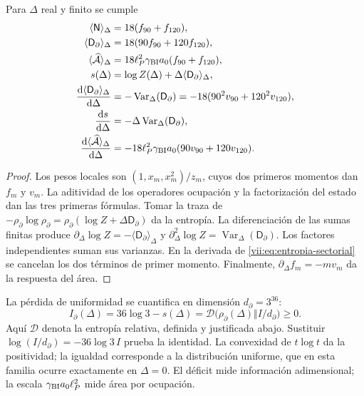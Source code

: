 \begin{proposition}
\label{vii:prop:respuesta-sectorial}
Para \(\Delta\) real y finito se cumple
\begin{align}
 \langle\mathsf N\rangle_\Delta&=18(f_{90}+f_{120}),\\
 \langle\mathsf D_\partial\rangle_\Delta&=18(90f_{90}+120f_{120}),\\
 \langle\widehat{\mathcal A}\rangle_\Delta
 &=18\ell_P^2\gamma_{\rm BI}a_0(f_{90}+f_{120}),\\
 s(\Delta)&=\log Z(\Delta)+\Delta\langle\mathsf D_\partial\rangle_\Delta,
 \label{vii:eq:entropia-sectorial}\\
 \frac{\mathrm d\langle\mathsf D_\partial\rangle_\Delta}{\mathrm d\Delta}
 &=-\operatorname{Var}_\Delta(\mathsf D_\partial)
  =-18(90^2v_{90}+120^2v_{120}),\\
 \frac{\mathrm ds}{\mathrm d\Delta}
 &=-\Delta\operatorname{Var}_\Delta(\mathsf D_\partial),\\
 \frac{\mathrm d\langle\widehat{\mathcal A}\rangle_\Delta}{\mathrm d\Delta}
 &=-18\ell_P^2\gamma_{\rm BI}a_0(90v_{90}+120v_{120}).
 \label{vii:eq:respuestas-area-entropia}
\end{align}
\end{proposition}
\begin{proof}
Los pesos locales son \((1,x_m,x_m^2)/z_m\), cuyos dos primeros
momentos dan \(f_m\) y \(v_m\). La aditividad de los operadores
ocupación y la factorización del estado dan las tres primeras fórmulas.
Tomar la traza de
\(-\rho_\partial\log\rho_\partial
=\rho_\partial(\log Z+\Delta\mathsf D_\partial)\)
da la entropía. La diferenciación de las sumas finitas produce
\(\partial_\Delta\log Z=-\langle\mathsf D_\partial\rangle_\Delta\)
y \(\partial_\Delta^2\log Z
=\operatorname{Var}_\Delta(\mathsf D_\partial)\).
Los factores independientes suman sus varianzas. En la derivada de
\eqref{vii:eq:entropia-sectorial} se cancelan los dos términos de
primer momento. Finalmente, \(\partial_\Delta f_m=-mv_m\)
da la respuesta del área.
\end{proof}

La pérdida de uniformidad se cuantifica en dimensión \(d_\partial=3^{36}\):
\begin{equation}
 I_\partial(\Delta)
 =36\log3-s(\Delta)
 =\mathcal D\bigl(\rho_\partial(\Delta)\Vert I/d_\partial\bigr)\ge0.
 \label{vii:eq:deficit-informacional}
\end{equation}
Aquí \(\mathcal D\) denota la entropía relativa, definida y justificada
abajo. Sustituir \(\log(I/d_\partial)=-36\log3\,I\) prueba la
identidad. La convexidad de \(t\log t\) da la positividad; la igualdad
corresponde a la distribución uniforme, que en esta familia ocurre
exactamente en \(\Delta=0\). El déficit mide información adimensional;
la escala \(\gamma_{\rm BI}a_0\ell_P^2\) mide área por ocupación.

